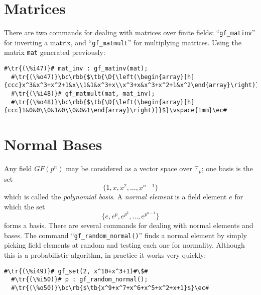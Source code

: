 \documentclass[a4paper,11pt,leqno,fleqn]{artikel3}
\newcommand{\D}{\displaystyle}
\newcommand{\bc}{\begin{center}}
\newcommand{\ec}{\end{center}}
\newcommand{\tr}[1]{\textcolor{red}{#1}}
\newcommand{\tb}[1]{\textcolor{blue}{#1}}
\newcommand{\rb}[1]{\raisebox{2mm}[0mm][1mm]{#1}}
\newcommand{\rbb}[1]{\raisebox{-4mm}[0mm][9mm]{#1}}
\begin{document}
\section*{Matrices}

There are two commands for dealing with matrices over finite fields:
``\verb!gf_matinv!'' for inverting a matrix, and ``\verb!gf_matmult!'' for
multiplying matrices.  Using the matrix \texttt{mat} generated previously:

\vspace*{2mm}
\begin{lstlisting}[escapechar=\#]
  #\tr{(\%i47)}# mat_inv : gf_matinv(mat);
  #\tr{(\%o47)}\bc\rbb{$\tb{\D{\left(\begin{array}[h]{ccc}x^3&x^3+x^2+1&x\\1&1&x^3+x\\x^3+x&x^3+x^2+1&x^2\end{array}\right)}}$}\vspace{3mm}\ec#
  #\tr{(\%i48)}# gf_matmult(mat, mat_inv);
  #\tr{(\%o48)}\bc\rbb{$\tb{\D{\left(\begin{array}[h]{ccc}1&0&0\\0&1&0\\0&0&1\end{array}\right)}}$}\vspace{1mm}\ec#
\end{lstlisting}


\section*{Normal Bases}

Any field $GF(p^n)$ may be considered as a vector space over
$\mathbb{F}_p$; one basis is the set
\[
\{1,x,x^2,\ldots,x^{n-1}\}
\]
which is called the \emph{polynomial basis}.  A \emph{normal element} is a
field element $e$ for which the set
\[
\{e,e^p,e^{p^2},\ldots,e^{p^{n-1}}\}
\]
forms a basis.  There are several commands for dealing with normal elements
and bases.  The command ``\verb!gf_random_normal()!'' finds a normal element by
simply picking field elements at random and testing each one for normality.
Although this is a probabilistic algorithm, in practice it works very quickly:


\vspace*{2mm}
\begin{lstlisting}[escapechar=\#]
  #\tr{(\%i49)}# gf_set(2, x^10+x^3+1)#\$#
  #\tr{(\%i50)}# p : gf_random_normal();
  #\tr{(\%o50)}\bc\rb{$\tb{x^9+x^7+x^6+x^5+x^2+x+1}$}\ec#
\end{lstlisting}
\end{document}
